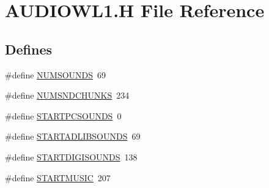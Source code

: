 \hypertarget{AUDIOWL1_8H}{
\section{AUDIOWL1.H File Reference}
\label{AUDIOWL1_8H}
}
\subsection*{Defines}
\begin{DoxyCompactItemize}
\item 
\#define \hyperlink{AUDIOWL1_8H_aa948e91a657468d5faa690ec1a89230b}{NUMSOUNDS}~69
\item 
\#define \hyperlink{AUDIOWL1_8H_adb660029e11963733384781d8bd6dc24}{NUMSNDCHUNKS}~234
\item 
\#define \hyperlink{AUDIOWL1_8H_a1c2885b0208a74942feaa303bb5b1119}{STARTPCSOUNDS}~0
\item 
\#define \hyperlink{AUDIOWL1_8H_a7d40bf6bf62cde9ae5f212e063328200}{STARTADLIBSOUNDS}~69
\item 
\#define \hyperlink{AUDIOWL1_8H_adb5a42984ba81d350a944cc41434a6f7}{STARTDIGISOUNDS}~138
\item 
\#define \hyperlink{AUDIOWL1_8H_acdd20a00d56efe82715df1d7a2facc10}{STARTMUSIC}~207
\end{DoxyCompactItemize}
